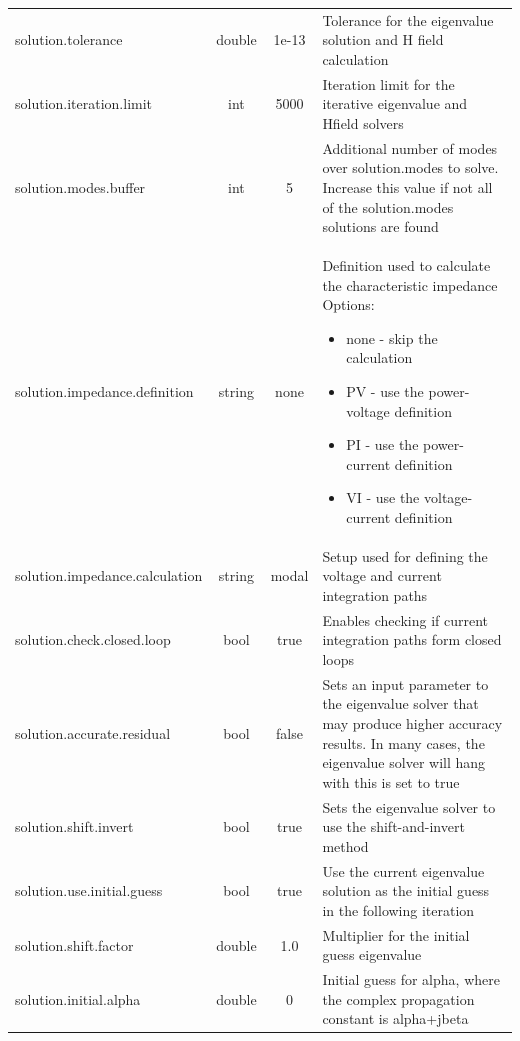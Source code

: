 \documentclass[titlepage]{article}
\renewcommand\_{\textunderscore\linebreak[1]}
\begin{document}
\begin{longtable}[c]{|lccp{8cm}|}
    solution.tolerance            & double & 1e-13  & Tolerance for the eigenvalue solution and H field calculation \\
    solution.iteration.limit      & int    & 5000   & Iteration limit for the iterative eigenvalue and Hfield solvers \\
    solution.modes.buffer         & int    & 5      & Additional number of modes over solution.modes to solve.  Increase this value if not all of the solution.modes solutions are found \\
    solution.impedance.definition & string & none & Definition used to calculate the characteristic impedance
                                                   Options:
                                                   \begin{itemize}[nosep]
                                                     \item none - skip the calculation
                                                     \item PV   - use the power-voltage definition
                                                     \item PI   - use the power-current definition
                                                     \item VI   - use the voltage-current definition
                                                   \end{itemize} \\
    solution.impedance.calculation & string & modal & Setup used for defining the voltage and current integration paths \\
    solution.check.closed.loop    & bool   & true   & Enables checking if current integration paths form closed loops \\
    solution.accurate.residual    & bool   & false  & Sets an input parameter to the eigenvalue solver that may produce higher accuracy results. In many cases, the eigenvalue solver will hang with this is set to true \\
    solution.shift.invert         & bool   & true   & Sets the eigenvalue solver to use the shift-and-invert method \\
    solution.use.initial.guess    & bool   & true   & Use the current eigenvalue solution as the initial guess in the following iteration \\
    solution.shift.factor         & double & 1.0    & Multiplier for the initial guess eigenvalue \\
    solution.initial.alpha        & double & 0      & Initial guess for alpha, where the complex propagation constant is alpha+jbeta \\

\end{longtable}
\end{document}
